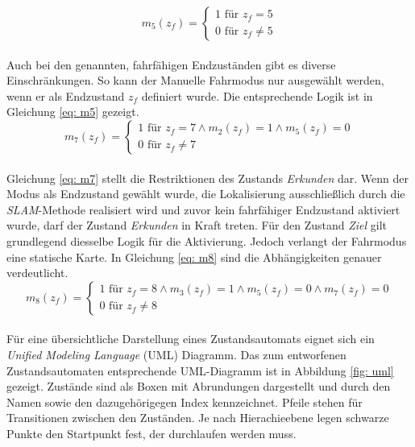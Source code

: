 		
				\begin{equation}
					m_5(z_f)=\left\{\begin{array}{ll} 1 \text{ für } z_f=5 \\
						0 \text{ für }z_f\neq 5\end{array}\right. 
					\label{eq: m5}
				\end{equation}\\
			
		Auch bei den genannten, fahrfähigen Endzuständen gibt es diverse Einschränkungen. So kann der Manuelle Fahrmodus nur ausgewählt werden, wenn er als Endzustand $z_f$ definiert wurde. Die entsprechende Logik ist in Gleichung \ref{eq: m5} gezeigt.\\
		
				\begin{equation}
					m_7(z_f)=\left\{\begin{array}{ll} 1 \text{ für } z_f=7 \wedge m_2(z_f)=1 \wedge m_5(z_f)=0 \\
						0 \text{ für }z_f\neq 7\end{array}\right.
					\label{eq: m7}
				\end{equation}\\
				
		Gleichung \ref{eq: m7} stellt die Restriktionen des Zustands \textit{Erkunden} dar. Wenn der Modus als Endzustand gewählt wurde, die Lokalisierung ausschließlich durch die \textit{SLAM}-Methode realisiert wird und zuvor kein fahrfähiger Endzustand aktiviert wurde, darf der Zustand \textit{Erkunden} in Kraft treten. Für den Zustand \textit{Ziel} gilt grundlegend diesselbe Logik für die Aktivierung. Jedoch verlangt der Fahrmodus eine statische Karte. In Gleichung \ref{eq: m8} sind die Abhängigkeiten genauer verdeutlicht.\\
		
		
				\begin{equation}
					m_8(z_f)=\left\{\begin{array}{ll} 1 \text{ für } z_f=8 \wedge m_3(z_f)=1 \wedge m_5(z_f)=0 \wedge m_7(z_f)=0 \\
						0 \text{ für }z_f\neq 8\end{array}\right.
					\label{eq: m8}
				\end{equation}\\
		
		Für eine übersichtliche Darstellung eines Zustandsautomats eignet sich ein \textit{Unified Modeling Language} (UML) Diagramm. Das zum entworfenen Zustandsautomaten entsprechende UML-Diagramm ist in Abbildung \ref{fig: uml} gezeigt. Zustände sind als Boxen mit Abrundungen dargestellt und durch den Namen sowie den dazugehörigegen Index kennzeichnet. Pfeile stehen für Transitionen zwischen den Zuständen. Je nach Hierachieebene legen schwarze Punkte den Startpunkt fest, der durchlaufen werden muss. 
		
